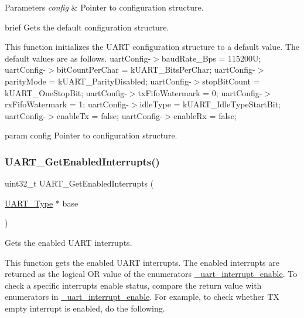 \begin{DoxyParams}{Parameters}
{\em config} & Pointer to configuration structure.\\
\hline
\end{DoxyParams}
brief Gets the default configuration structure.

This function initializes the U\+A\+RT configuration structure to a default value. The default values are as follows. uart\+Config-\/$>$baud\+Rate\+\_\+\+Bps = 115200U; uart\+Config-\/$>$bit\+Count\+Per\+Char = k\+U\+A\+R\+T\+\_\+Bits\+Per\+Char; uart\+Config-\/$>$parity\+Mode = k\+U\+A\+R\+T\+\_\+\+Parity\+Disabled; uart\+Config-\/$>$stop\+Bit\+Count = k\+U\+A\+R\+T\+\_\+\+One\+Stop\+Bit; uart\+Config-\/$>$tx\+Fifo\+Watermark = 0; uart\+Config-\/$>$rx\+Fifo\+Watermark = 1; uart\+Config-\/$>$idle\+Type = k\+U\+A\+R\+T\+\_\+\+Idle\+Type\+Start\+Bit; uart\+Config-\/$>$enable\+Tx = false; uart\+Config-\/$>$enable\+Rx = false;

param config Pointer to configuration structure. \mbox{\label{group__uart__driver_ga79bc0b880286ec0dc0543606fc772912}} 
\subsubsection{\texorpdfstring{UART\_GetEnabledInterrupts()}{UART\_GetEnabledInterrupts()}}
{\footnotesize\ttfamily uint32\+\_\+t U\+A\+R\+T\+\_\+\+Get\+Enabled\+Interrupts (\begin{DoxyParamCaption}\item[{\mbox{\hyperlink{struct_u_a_r_t___type}{U\+A\+R\+T\+\_\+\+Type}} $\ast$}]{base }\end{DoxyParamCaption})}



Gets the enabled U\+A\+RT interrupts. 

This function gets the enabled U\+A\+RT interrupts. The enabled interrupts are returned as the logical OR value of the enumerators \mbox{\hyperlink{group__uart__driver_ga700f3cd8e3800273a1591307cab6311c}{\+\_\+uart\+\_\+interrupt\+\_\+enable}}. To check a specific interrupts enable status, compare the return value with enumerators in \mbox{\hyperlink{group__uart__driver_ga700f3cd8e3800273a1591307cab6311c}{\+\_\+uart\+\_\+interrupt\+\_\+enable}}. For example, to check whether TX empty interrupt is enabled, do the following. 
\begin{DoxyCode}{0}
\DoxyCodeLine{}
\DoxyCodeLine{\{}
\DoxyCodeLine{\}}
\end{DoxyCode}



